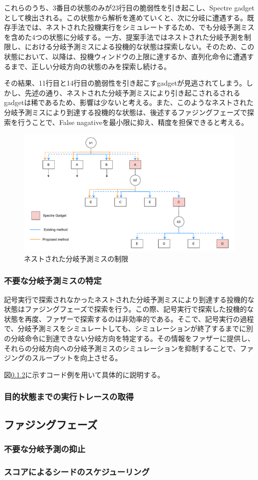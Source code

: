 これらのうち、3番目の状態のみが23行目の脆弱性を引き起こし、Spectre gadgetとして検出される。この状態から解析を進めていくと、次に分岐に遭遇する。既存手法では、ネストされた投機実行をシミュレートするため、でも分岐予測ミスを含めた4つの状態に分岐する。一方、提案手法ではネストされた分岐予測を制限し、における分岐予測ミスによる投機的な状態は探索しない。そのため、この状態において、以降は、投機ウィンドウの上限に達するか、直列化命令に遭遇するまで、正しい分岐方向の状態のみを探索し続ける。\par

その結果、11行目と14行目の脆弱性を引き起こすgadgetが見逃されてしまう。しかし、先述の通り、ネストされた分岐予測ミスにより引き起こされるされるgadgetは稀であるため、影響は少ないと考える。また、このようなネストされた分岐予測ミスにより到達する投機的な状態は、後述するファジングフェーズで探索を行うことで、False nagativeを最小限に抑え、精度を担保できると考える。\par

\begin{figure}[tb]
  \centering
  \includegraphics[width=\linewidth]{img/SpecOrder_cfg.drawio.pdf}
  \caption{ネストされた分岐予測ミスの制限}\label{fig:SpecOrder_cfg}
\end{figure}

\subsubsection{不要な分岐予測ミスの特定}
記号実行で探索されなかったネストされた分岐予測ミスにより到達する投機的な状態はファジングフェーズで探索を行う。この際、記号実行で探索した投機的な状態を再度、ファザーで探索するのは非効率的である。そこで、記号実行の過程で、分岐予測ミスをシミュレートしても、シミュレーションが終了するまでに別の分岐命令に到達できない分岐方向を特定する。その情報をファザーに提供し、それらの分岐方向への分岐予測ミスのシミュレーションを抑制することで、ファジングのスループットを向上させる。\par
図\ref{}に示すコード例を用いて具体的に説明する。


\subsubsection{目的状態までの実行トレースの取得}
\subsection{ファジングフェーズ}
\subsubsection{不要な分岐予測の抑止}
\subsubsection{スコアによるシードのスケジューリング}
